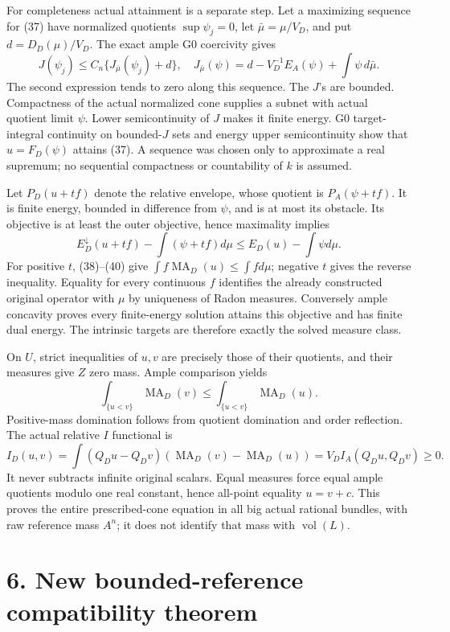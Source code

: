 \documentclass[
  10pt,
]{article}
\begin{document}
For completeness actual attainment is a separate step. Let a maximizing
sequence for (37) have normalized quotients \(\sup\psi_j=0\), let
\(\bar\mu=\mu/V_D\), and put \(d=D_D(\mu)/V_D\). The exact ample G0
coercivity gives \[J(\psi_j)\leq C_n\{J_{\bar\mu}(\psi_j)+d\},\quad
J_{\bar\mu}(\psi)=d-V_D^{-1}E_A(\psi)+\int\psi\,d\bar\mu.\tag{39}\] The
second expression tends to zero along this sequence. The \(J\)'s are
bounded. Compactness of the actual normalized cone supplies a subnet
with actual quotient limit \(\psi\). Lower semicontinuity of \(J\) makes
it finite energy. G0 target-integral continuity on bounded-\(J\) sets
and energy upper semicontinuity show that \(u=F_D(\psi)\) attains (37).
A sequence was chosen only to approximate a real supremum; no sequential
compactness or countability of \(k\) is assumed.

Let \(P_D(u+tf)\) denote the relative envelope, whose quotient is
\(P_A(\psi+tf)\). It is finite energy, bounded in difference from
\(\psi\), and is at most its obstacle. Its objective is at least the
outer objective, hence maximality implies
\[E_D^\downarrow(u+tf)-\int(\psi+tf)d\mu
\leq E_D(u)-\int\psi d\mu.\tag{40}\] For positive \(t\), (38)--(40) give
\(\int f\operatorname{MA}_D(u)\leq\int f d\mu\); negative \(t\) gives
the reverse inequality. Equality for every continuous \(f\) identifies
the already constructed original operator with \(\mu\) by uniqueness of
Radon measures. Conversely ample concavity proves every finite-energy
solution attains this objective and has finite dual energy. The
intrinsic targets are therefore exactly the solved measure class.

On \(U\), strict inequalities of \(u,v\) are precisely those of their
quotients, and their measures give \(Z\) zero mass. Ample comparison
yields \[\int_{\{u<v\}}\operatorname{MA}_D(v)\leq
\int_{\{u<v\}}\operatorname{MA}_D(u).\tag{41}\] Positive-mass domination
follows from quotient domination and order reflection. The actual
relative \(I\) functional is
\[I_D(u,v)=\int(Q_Du-Q_Dv)(\operatorname{MA}_D(v)-\operatorname{MA}_D(u))
=V_D I_A(Q_Du,Q_Dv)\geq0.\tag{42}\] It never subtracts infinite original
scalars. Equal measures force equal ample quotients modulo one real
constant, hence all-point equality \(u=v+c\). This proves the entire
prescribed-cone equation in all big actual rational bundles, with raw
reference mass \(A^n\); it does not identify that mass with
\(\operatorname{vol}(L)\).

\section{6. New bounded-reference compatibility
theorem}\label{new-bounded-reference-compatibility-theorem}
\end{document}
